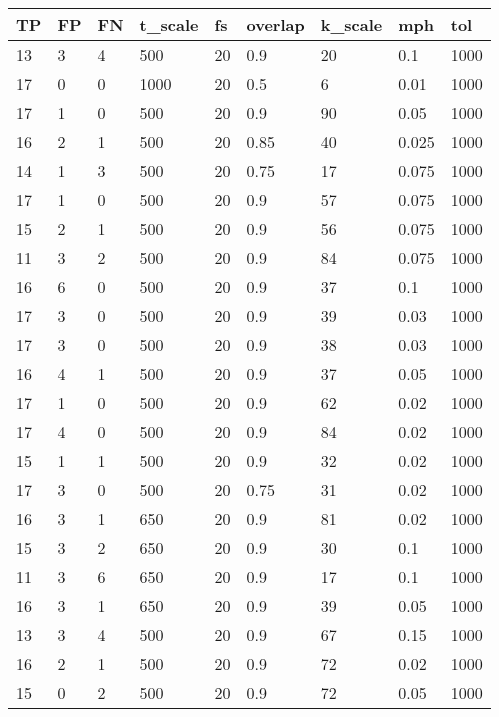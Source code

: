 \begin{table}[!ht]
    \centering
    \begin{tabular}{|l|l|l|l|l|l|l|l|l|}
    \hline
        TP & FP & FN & t\_scale & fs & overlap & k\_scale & mph & tol \\ \hline
        13 & 3 & 4 & 500 & 20 & 0.9 & 20 & 0.1 & 1000 \\ \hline
        17 & 0 & 0 & 1000 & 20 & 0.5 & 6 & 0.01 & 1000 \\ \hline
        17 & 1 & 0 & 500 & 20 & 0.9 & 90 & 0.05 & 1000 \\ \hline
        16 & 2 & 1 & 500 & 20 & 0.85 & 40 & 0.025 & 1000 \\ \hline
        14 & 1 & 3 & 500 & 20 & 0.75 & 17 & 0.075 & 1000 \\ \hline
        17 & 1 & 0 & 500 & 20 & 0.9 & 57 & 0.075 & 1000 \\ \hline
        15 & 2 & 1 & 500 & 20 & 0.9 & 56 & 0.075 & 1000 \\ \hline
        11 & 3 & 2 & 500 & 20 & 0.9 & 84 & 0.075 & 1000 \\ \hline
        16 & 6 & 0 & 500 & 20 & 0.9 & 37 & 0.1 & 1000 \\ \hline
        17 & 3 & 0 & 500 & 20 & 0.9 & 39 & 0.03 & 1000 \\ \hline
        17 & 3 & 0 & 500 & 20 & 0.9 & 38 & 0.03 & 1000 \\ \hline
        16 & 4 & 1 & 500 & 20 & 0.9 & 37 & 0.05 & 1000 \\ \hline
        17 & 1 & 0 & 500 & 20 & 0.9 & 62 & 0.02 & 1000 \\ \hline
        17 & 4 & 0 & 500 & 20 & 0.9 & 84 & 0.02 & 1000 \\ \hline
        15 & 1 & 1 & 500 & 20 & 0.9 & 32 & 0.02 & 1000 \\ \hline
        17 & 3 & 0 & 500 & 20 & 0.75 & 31 & 0.02 & 1000 \\ \hline
        16 & 3 & 1 & 650 & 20 & 0.9 & 81 & 0.02 & 1000 \\ \hline
        15 & 3 & 2 & 650 & 20 & 0.9 & 30 & 0.1 & 1000\\ \hline
        11 & 3 & 6 & 650 & 20 & 0.9 & 17 & 0.1 & 1000\\ \hline
        16 & 3 & 1 & 650 & 20 & 0.9 & 39 & 0.05 & 1000\\ \hline
        13 & 3 & 4 & 500 & 20 & 0.9 & 67 & 0.15 & 1000 \\ \hline
        16 & 2 & 1 & 500 & 20 & 0.9 & 72 & 0.02 & 1000 \\ \hline
        15 & 0 & 2 & 500 & 20 & 0.9 & 72 & 0.05 & 1000 \\ \hline

\end{tabular}
\end{table}
